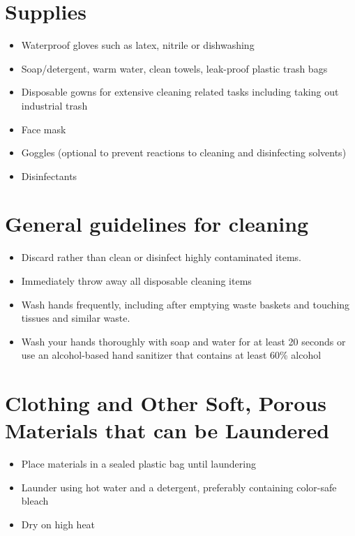 \documentclass[onecolumn,journal]{IEEEtran}
\begin{document}
\begin{multicols}{2}
\section*{Supplies}
\begin{itemize}
    \item Waterproof gloves such as latex, nitrile or dishwashing
    \item Soap/detergent, warm water, clean towels, leak-proof plastic trash bags
    \item Disposable gowns for extensive cleaning related tasks including taking out industrial trash
    \item Face mask
    \item Goggles (optional to prevent reactions to cleaning and disinfecting solvents)
    \item Disinfectants
\end{itemize}

\section*{General guidelines for cleaning}
\begin{itemize}
    \item Discard rather than clean or disinfect highly contaminated items. 
    \item Immediately throw away all disposable cleaning items
    \item Wash hands frequently, including after emptying waste baskets and touching tissues and similar waste.
    \item Wash your hands thoroughly with soap and water for at least 20 seconds or use an alcohol-based hand sanitizer that contains at least
    60\% alcohol
\end{itemize}

\section* {Clothing and Other Soft, Porous Materials that can be Laundered}
\begin{itemize}
    \item Place materials in a sealed plastic bag until laundering
    \item Launder using hot water and a detergent, preferably containing color-safe bleach
    \item Dry on high heat
\end{itemize}


\end{multicols}
\end{document}

